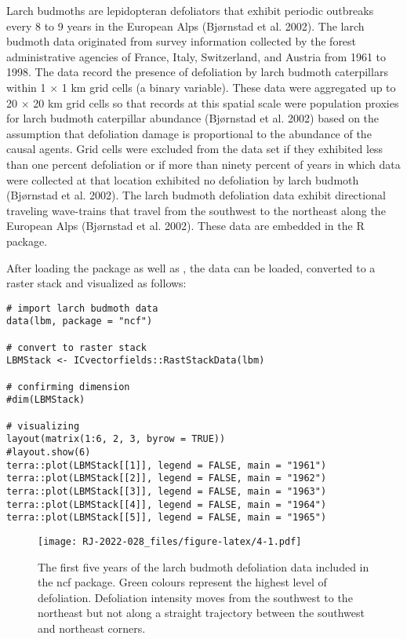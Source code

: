 Larch budmoths are lepidopteran defoliators that exhibit periodic outbreaks every 8 to 9 years in the European Alps (Bjørnstad et al. 2002). The larch budmoth data originated from survey information collected by the forest administrative agencies of France, Italy, Switzerland, and Austria from 1961 to 1998. The data record the presence of defoliation by larch budmoth caterpillars within 1 \(\times\) 1 km grid cells (a binary variable). These data were aggregated up to 20 \(\times\) 20 km grid cells so that records at this spatial scale were population proxies for larch budmoth caterpillar abundance (Bjørnstad et al. 2002) based on the assumption that defoliation damage is proportional to the abundance of the causal agents. Grid cells were excluded from the data set if they exhibited less than one percent defoliation or if more than ninety percent of years in which data were collected at that location exhibited no defoliation by larch budmoth (Bjørnstad et al. 2002). The larch budmoth defoliation data exhibit directional traveling wave-trains that travel from the southwest to the northeast along the European Alps (Bjørnstad et al. 2002). These data are embedded in the  R package.

After loading the  package as well as , the data can be loaded, converted to a raster stack and visualized as follows:

\begin{verbatim}
# import larch budmoth data
data(lbm, package = "ncf")

# convert to raster stack
LBMStack <- ICvectorfields::RastStackData(lbm)

# confirming dimension
#dim(LBMStack)

# visualizing
layout(matrix(1:6, 2, 3, byrow = TRUE))
#layout.show(6)
terra::plot(LBMStack[[1]], legend = FALSE, main = "1961")
terra::plot(LBMStack[[2]], legend = FALSE, main = "1962")
terra::plot(LBMStack[[3]], legend = FALSE, main = "1963")
terra::plot(LBMStack[[4]], legend = FALSE, main = "1964")
terra::plot(LBMStack[[5]], legend = FALSE, main = "1965")
\end{verbatim}

\begin{figure}
\centering
\texttt{[image: RJ-2022-028\_files/figure-latex/4-1.pdf]}
\caption{\label{fig:4}The first five years of the larch budmoth defoliation data included in the ncf package. Green colours represent the highest level of defoliation. Defoliation intensity moves from the southwest to the northeast but not along a straight trajectory between the southwest and northeast corners.}
\end{figure}

